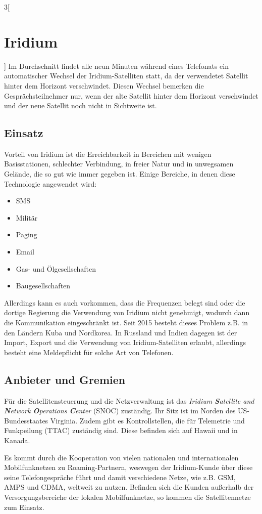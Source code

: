 \begin{multicols}{3}[\section{Iridium}]
Im Durchschnitt findet alle neun Minuten während eines Telefonats ein automatischer Wechsel der Iridium-Satelliten statt, da der verwendetet Satellit hinter dem Horizont verschwindet. Diesen Wechsel bemerken die Gesprächsteilnehmer nur, wenn der alte Satellit hinter dem Horizont verschwindet und der neue Satellit noch nicht in Sichtweite ist.~\cite{I4}

\subsection*{Einsatz}
Vorteil von Iridium ist die Erreichbarkeit in Bereichen mit wenigen Basisstationen, schlechter Verbindung, in freier Natur und in unwegsamen Gelände, die so gut wie immer gegeben ist.
Einige Bereiche, in denen diese Technologie angewendet wird: 

\begin{itemize}
	\item SMS
	\item Militär
	\item Paging
	\item Email
	\item Gas- und Ölgesellschaften
	\item Baugesellschaften
	\end{itemize}

Allerdings kann es auch vorkommen, dass die Frequenzen belegt sind oder die dortige Regierung die Verwendung von Iridium nicht genehmigt, wodurch dann die Kommunikation eingeschränkt ist. Seit 2015 besteht dieses Problem z.B. in den Ländern Kuba und Nordkorea. In Russland und Indien dagegen ist der Import, Export und die Verwendung von Iridium-Satelliten erlaubt, allerdings besteht eine Meldepflicht für solche Art von Telefonen.~\cite{I3,I4}

\subsection*{Anbieter und Gremien}

Für die Satellitensteuerung und die Netzverwaltung ist das \textit{Iridium \textbf{S}atellite and \textbf{N}etwork \textbf{O}perations \textbf{C}enter} (SNOC) zuständig. Ihr Sitz ist im Norden des US-Bundesstaates Virginia. Zudem gibt es Kontrollstellen, die für Telemetrie und Funkpeilung (TTAC) zuständig sind. Diese befinden sich auf Hawaii und in Kanada.

Es kommt durch die Kooperation von vielen nationalen und internationalen Mobilfunknetzen zu Roaming-Partnern, weswegen der Iridium-Kunde über diese seine Telefongespräche führt und damit verschiedene Netze, wie z.B. GSM, AMPS und CDMA, weltweit zu nutzen. Befinden sich die Kunden außerhalb der Versorgungsbereiche der lokalen Mobilfunknetze, so kommen die Satellitennetze zum Einsatz. ~\cite{I1}



\end{multicols}
\newpage
